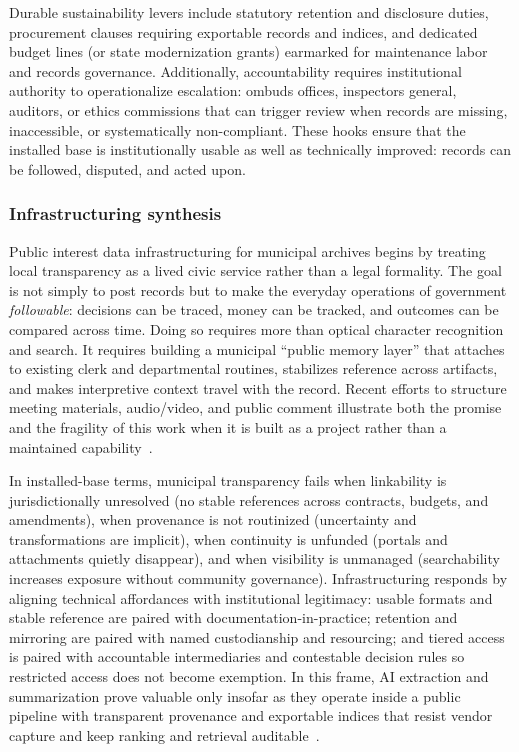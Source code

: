 \documentclass[acmsmall,screen]{acmart}
\begin{document}
Durable sustainability levers include statutory retention and disclosure duties, procurement clauses requiring exportable records and indices, and dedicated budget lines (or state modernization grants) earmarked for maintenance labor and records governance. Additionally, accountability requires institutional authority to operationalize escalation: ombuds offices, inspectors general, auditors, or ethics commissions that can trigger review when records are missing, inaccessible, or systematically non-compliant. These hooks ensure that the installed base is institutionally usable as well as technically improved: records can be followed, disputed, and acted upon.

\subsubsection*{Infrastructuring synthesis}
Public interest data infrastructuring for municipal archives begins by treating local transparency as a lived civic service rather than a legal formality. The goal is not simply to post records but to make the everyday operations of government \textit{followable}: decisions can be traced, money can be tracked, and outcomes can be compared across time. Doing so requires more than optical character recognition and search. It requires building a municipal ``public memory layer'' that attaches to existing clerk and departmental routines, stabilizes reference across artifacts, and makes interpretive context travel with the record. Recent efforts to structure meeting materials, audio/video, and public comment illustrate both the promise and the fragility of this work when it is built as a project rather than a maintained capability~\cite{brownCouncilDataProject2021,barariPromiseTextAudio2025a}.

In installed-base terms, municipal transparency fails when linkability is jurisdictionally unresolved (no stable references across contracts, budgets, and amendments), when provenance is not routinized (uncertainty and transformations are implicit), when continuity is unfunded (portals and attachments quietly disappear), and when visibility is unmanaged (searchability increases exposure without community governance). Infrastructuring responds by aligning technical affordances with institutional legitimacy: usable formats and stable reference are paired with documentation-in-practice; retention and mirroring are paired with named custodianship and resourcing; and tiered access is paired with accountable intermediaries and contestable decision rules so restricted access does not become exemption. In this frame, AI extraction and summarization prove valuable only insofar as they operate inside a public pipeline with transparent provenance and exportable indices that resist vendor capture and keep ranking and retrieval auditable~\cite{barariLocalViewDatabasePublic2023,warrenRequestAtlasSupportingSlow2025}.
\end{document}
